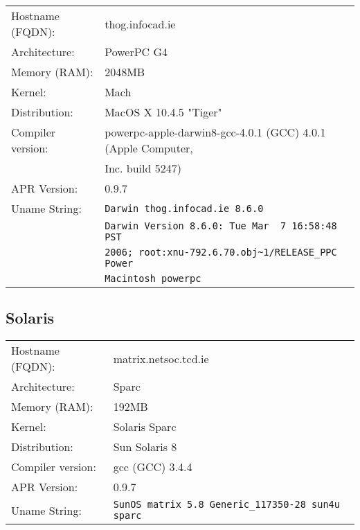 \begin{tabular}{ll}
Hostname (FQDN):	&	thog.infocad.ie	 				\\
Architecture:		&	PowerPC G4							\\
Memory (RAM):		&	2048MB								\\
Kernel:				&	Mach									\\
Distribution:		&	MacOS X 10.4.5 "Tiger"			\\
Compiler version:	&	powerpc-apple-darwin8-gcc-4.0.1 (GCC) 4.0.1 (Apple Computer,\\ 
						&	Inc. build 5247)\\
APR Version:		&	0.9.7									\\
Uname String:		& \verb!Darwin thog.infocad.ie 8.6.0!\\
						& \verb!Darwin Version 8.6.0: Tue Mar  7 16:58:48 PST!\\ 
						& \verb!2006; root:xnu-792.6.70.obj~1/RELEASE_PPC Power! \\ 
						& \verb!Macintosh powerpc!	\\
\end{tabular}

\subsection{Solaris}

\begin{tabular}{ll}
Hostname (FQDN):	&	matrix.netsoc.tcd.ie				\\
Architecture:		&	Sparc									\\
Memory (RAM):		&	192MB									\\
Kernel:				&	Solaris Sparc						\\
Distribution:		&	Sun Solaris 8						\\
Compiler version:	&	gcc (GCC) 3.4.4					\\
APR Version:		&	0.9.7									\\
Uname String:		& \verb!SunOS matrix 5.8 Generic_117350-28 sun4u sparc! \\
\end{tabular}

